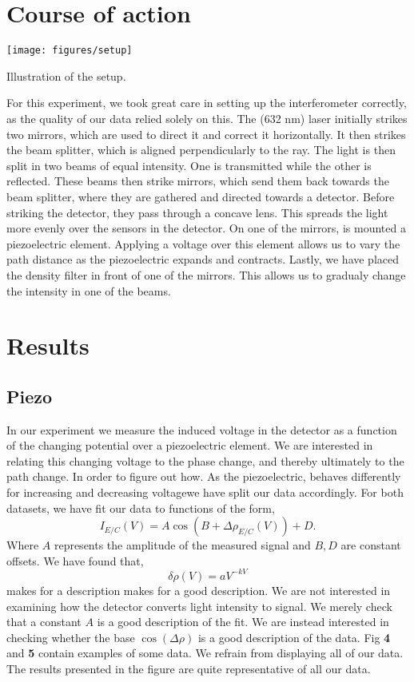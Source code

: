 \documentclass[working, oneside]{inputs/tuftebook}
\begin{document}
\section*{Course of action}
\begin{marginfigure}
	\texttt{[image: figures/setup]}
	\caption{Illustration of the setup.}
\end{marginfigure}
		For this experiment, we took great care in setting up the interferometer correctly, as the quality of our data relied solely on this. The (632 nm) laser initially strikes two mirrors, which are used to direct it and correct it horizontally. It then strikes the beam splitter, which is aligned perpendicularly to the ray. The light is then split in two beams of equal intensity. One is transmitted while the other is reflected. These beams then strike mirrors, which send them back towards the beam splitter, where they are gathered and directed towards a detector. Before striking the detector, they pass through a concave lens. This spreads the light more evenly over the sensors in the detector. On one of the mirrors, is mounted a piezoelectric element. Applying a voltage over this element allows us to vary the path distance as the piezoelectric expands and contracts. Lastly, we have placed the density filter in front of one of the mirrors. This allows us to gradualy change the intensity in one of the beams.
\section*{Results}
\subsection*{Piezo}
In our experiment we measure the induced voltage in the detector as a function of the changing potential over a piezoelectric element. We are interested in relating this changing voltage to the phase change, and thereby ultimately to the path change. In order to figure out how. As the piezoelectric, behaves differently for increasing and decreasing voltagewe have split our data accordingly. For both datasets, we have fit our data to functions of the form,
\[
	I_{E /C} \left( V \right) = A \cos \left( B + \Delta \rho_{E /C}\left( V \right)  \right) +D
.\] 
Where $A$ represents the amplitude of the measured signal and $B, D$ are constant offsets. We have found that,
\[
\delta \rho \left( V \right) = aV^{-kV}
\] makes for a description makes for a good description. We are not interested in examining how the detector converts light intensity to signal. We merely check that a constant $A$ is a good description of the fit. We are instead interested in checking whether the base $\cos\left( \Delta \rho  \right) $ is a good description of the data. Fig \textbf{4} and \textbf{5} contain examples of some data. We refrain from displaying all of our data. The results presented in the figure are quite representative of all our data.
\end{document}

